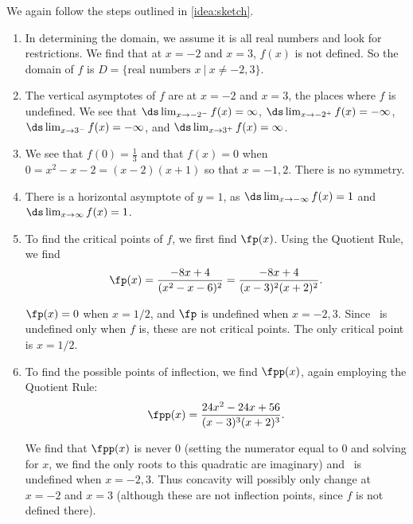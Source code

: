 {We again follow the steps outlined in \autoref{idea:sketch}.

\begin{enumerate}
	\item	In determining the domain, we assume it is all real numbers and look for restrictions. We find that at $x=-2$ and $x=3$, $f(x)$ is not defined. So the domain of $f$ is $D = \{\text{real numbers } x\ \vert \ x\neq -2,3\}$.
		
	\item	The vertical asymptotes of $f$ are at $x=-2$ and $x=3$, the places where $f$ is undefined.  We see that $\ds\lim_{x\to-2^-}f(x)=\infty$, $\ds\lim_{x\to-2^+}f(x)=-\infty$, $\ds\lim_{x\to3^-}f(x)=-\infty$, and $\ds\lim_{x\to3^+}f(x)=\infty$.
		
	\item	We see that $f(0)=\frac13$ and that $f(x)=0$ when $0=x^2-x-2=(x-2)(x+1)$ so that $x=-1,2$.  There is no symmetry.

	\item	There is a horizontal asymptote of $y=1$, as $\ds \lim_{x\to -\infty}f(x) = 1$ and $\ds\lim_{x\to\infty}f(x) =1$.
		
	\item	To find the critical points of $f$, we first find $\fp(x)$. Using the Quotient Rule, we find
	\[\fp(x) = \frac{-8x+4}{(x^2-x-6)^2} = \frac{-8x+4}{(x-3)^2(x+2)^2}.\]
		
	$\fp(x) = 0$ when $x = 1/2$, and $\fp$ is undefined when $x=-2,3$. Since \fp\ is undefined only when $f$ is, these are not critical points. The only critical point is $x=1/2$.
		
	\item	To find the possible points of inflection, we find $\fpp(x)$, again employing the Quotient Rule:
	\[\fpp(x) = \frac{24x^2-24x+56}{(x-3)^3(x+2)^3}.\]
		
	We find that $\fpp(x)$ is never 0 (setting the numerator equal to 0 and solving for $x$, we find the only roots to this quadratic are imaginary) and \fpp\ is undefined when $x=-2,3$. Thus concavity will possibly only change at $x=-2$ and $x=3$ (although these are not inflection points, since $f$ is not defined there).
		

\end{enumerate}}
